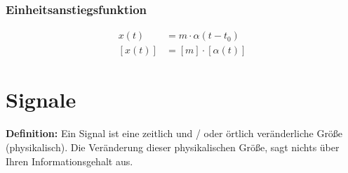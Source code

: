 \subsubsection{Einheitsanstiegsfunktion}
	\begin{multicols}{2}
		\vfill
		\begin{align*}
			x \left( t \right) &= m \cdot \alpha \left( t - t_0 \right) \\
			\left[ x \left( t \right) \right] &= \left[ m \right] \cdot \left[ \alpha \left(t\right) \right]
		\end{align*}
		\vspace{20mm}
		\vfill
		
		\vfill
	\end{multicols}
	
\newpage
\section{Signale}
\textbf{Definition:}
Ein Signal ist eine zeitlich und / oder örtlich veränderliche Größe (physikalisch).
Die Veränderung dieser physikalischen Größe, sagt nichts über Ihren Informationsgehalt aus.
	
\begin{center}
	
\end{center}